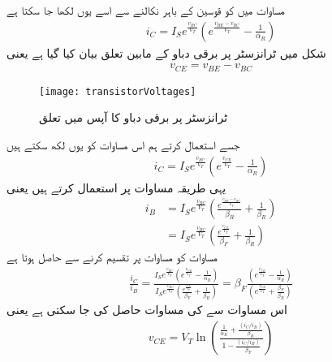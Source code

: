 مساوات   میں  کو قوسین کے باہر نکالنے سے اسے یوں لکھا جا سکتا ہے
\begin{align}
i_C = I_S e^{\frac{v_{BC}}{V_T}} \left (e^{\frac{v_{BE}-v_{BC}}{V_T}} -\frac{1}{\alpha_R}\right )
\end{align}
شکل   میں ٹرانزسٹر پر برقی دباو کے مابین تعلق بیان کیا گیا ہے  یعنی 
\begin{align}
v_{CE}=v_{BE}-v_{BC}
\end{align}
%
\begin{figure}
\centering
\texttt{[image: transistorVoltages]}
\caption{ٹرانزسٹر پر برقی دباو کا آپس میں تعلق}
\label{شکل_ٹرانزسٹر_پر_برقی_دباو_کا_آپس_میں_تعلق}
\end{figure}
 جسے استعمال کرتے ہم اس مساوات کو یوں لکھ سکتے ہیں
\begin{align} \label{مساوات_ٹرانزسٹر_مکمل_ایبر_مال_کلکٹر _رو_سادہ}
i_C =I_S e^{\frac{v_{BC}}{V_T}} \left (e^{\frac{v_{CE}}{V_T}}-\frac{1}{\alpha_R} \right )
\end{align}
یہی طریقہ مساوات   پر استعمال کرتے ہیں یعنی
\begin{align} \label{مساوات_ٹرانزسٹر_مکمل_ایبر_مال_قابو_رو_سادہ}
i_B&= I_S e^{\frac{v_{BC}}{V_T}} \left  (\frac{e^{\frac{v_{BE}-v_{BC}}{V_T}}}{\beta_R} +\frac{1}{\beta_R}\right )\\
&=I_S e^{\frac{v_{BC}}{V_T}} \left (\frac{e^{\frac{v_{CE}}{V_T}}}{\beta_F} +\frac{1}{\beta_R} \right )
\end{align}
مساوات    کو مساوات    پر تقسیم کرنے سے حاصل ہوتا ہے
\begin{align} \label{مساوات_ٹرانزسٹر_ایبر_مال_دباو_بالمقابل_رو_الف}
\frac{i_C}{i_B}=\frac{I_S e^{\frac{v_{BC}}{V_T}} \left (e^{\frac{v_{CE}}{V_T}}-\frac{1}{\alpha_R} \right )} {I_S e^{\frac{v_{BC}}{V_T}} \left (\frac{e^{\frac{v_{CE}}{V_T}}}{\beta_F}+\frac{1}{\beta_R} \right )}=\beta_F \frac{\left (e^{\frac{v_{CE}}{V_T}}-\frac{1}{\alpha_R} \right )}{\left (e^{\frac{v_{CE}}{V_T}}+\frac{\beta_F}{\beta_R} \right )}
\end{align}
اس مساوات سے   کی مساوات حاصل کی جا سکتی ہے یعنی
\begin{align} \label{مساوات_ٹرانزسٹر_ایبر_مال_دباو_بالمقابل_رو}
v_{CE}=V_T \ln \left (\frac{\frac{1}{\alpha_R}+\frac{\left (i_C/i_B\right )}{\beta_R}}{1-\frac{\left (i_C/i_B\right )}{\beta_F}} \right )
\end{align}
